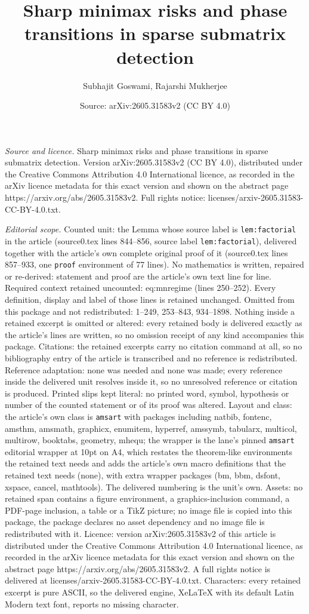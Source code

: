 \documentclass[10pt,a4paper]{amsart}
\title[Sharp minimax risks and phase transitions in sparse submatri]{Sharp minimax risks and phase transitions in sparse submatrix detection}
\author{Subhajit Goswami, Rajarshi Mukherjee}
\date{Source: arXiv:2605.31583v2 (CC BY 4.0)}
\begin{document}
\maketitle

\noindent\emph{Source and licence.} Sharp minimax risks and phase transitions in sparse submatrix detection. Version arXiv:2605.31583v2 (CC BY 4.0), distributed under the Creative Commons Attribution 4.0 International licence, as recorded in the arXiv licence metadata for this exact version and shown on the abstract page https://arxiv.org/abs/2605.31583v2. Full rights notice: licenses/arxiv-2605.31583-CC-BY-4.0.txt.\par\smallskip

\noindent\textit{Editorial scope.} Counted unit: the Lemma whose source label is \texttt{lem:factorial} in the article (source0.tex lines 844--856, source label \texttt{lem:factorial}), delivered together with the article's own complete original proof of it (source0.tex lines 857--933, one \texttt{proof} environment of 77 lines). No mathematics is written, repaired or re-derived: statement and proof are the article's own text line for line. Required context retained uncounted: eq:mnregime (lines 250--252). Every definition, display and label of those lines is retained unchanged. Omitted from this package and not redistributed: 1--249, 253--843, 934--1898. Nothing inside a retained excerpt is omitted or altered: every retained body is delivered exactly as the article's lines are written, so no omission receipt of any kind accompanies this package. Citations: the retained excerpts carry no citation command at all, so no bibliography entry of the article is transcribed and no reference is redistributed. Reference adaptation: none was needed and none was made; every reference inside the delivered unit resolves inside it, so no unresolved reference or citation is produced. Printed slips kept literal: no printed word, symbol, hypothesis or number of the counted statement or of its proof was altered. Layout and class: the article's own class is \texttt{amsart} with packages including natbib, fontenc, amsthm, amsmath, graphicx, enumitem, hyperref, amssymb, tabularx, multicol, multirow, booktabs, geometry, mhequ; the wrapper is the lane's pinned \texttt{amsart} editorial wrapper at 10pt on A4, which restates the theorem-like environments the retained text needs and adds the article's own macro definitions that the retained text needs (none), with extra wrapper packages (bm, bbm, dsfont, xspace, cancel, mathtools). The delivered numbering is the unit's own. Assets: no retained span contains a figure environment, a graphics-inclusion command, a PDF-page inclusion, a table or a TikZ picture; no image file is copied into this package, the package declares no asset dependency and no image file is redistributed with it. Licence: version arXiv:2605.31583v2 of this article is distributed under the Creative Commons Attribution 4.0 International licence, as recorded in the arXiv licence metadata for this exact version and shown on the abstract page https://arxiv.org/abs/2605.31583v2. A full rights notice is delivered at licenses/arxiv-2605.31583-CC-BY-4.0.txt. Characters: every retained excerpt is pure ASCII, so the delivered engine, XeLaTeX with its default Latin Modern text font, reports no missing character.
\end{document}
